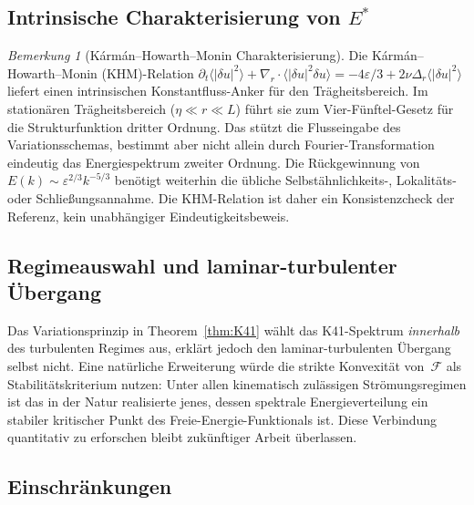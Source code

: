 \documentclass[12pt,a4paper]{article}
\theoremstyle{definition}
\theoremstyle{plain}
\theoremstyle{remark}
\newtheorem{remark}[definition]{Bemerkung}
\begin{document}
\subsection{Intrinsische Charakterisierung von \texorpdfstring{$E^*$}{E*}}

\begin{remark}[Kármán--Howarth--Monin Charakterisierung]
\label{rem:khm-intrinsic}
Die Kármán--Howarth--Monin (KHM)-Relation
$\partial_t \langle |\delta u|^2 \rangle + \nabla_r \cdot
\langle |\delta u|^2 \delta u \rangle = -4\varepsilon/3
+ 2\nu \Delta_r \langle |\delta u|^2 \rangle$ liefert einen intrinsischen
Konstantfluss-Anker für den Trägheitsbereich. Im stationären
Trägheitsbereich ($\eta \ll r \ll L$) führt sie zum Vier-Fünftel-Gesetz für
die Strukturfunktion dritter Ordnung. Das stützt die Flusseingabe des
Variationsschemas, bestimmt aber nicht allein durch Fourier-Transformation
eindeutig das Energiespektrum zweiter Ordnung. Die Rückgewinnung von
$E(k)\sim \varepsilon^{2/3}k^{-5/3}$ benötigt weiterhin die übliche
Selbstähnlichkeits-, Lokalitäts- oder Schließungsannahme. Die KHM-Relation
ist daher ein Konsistenzcheck der Referenz, kein unabhängiger
Eindeutigkeitsbeweis.
\end{remark}

\subsection{Regimeauswahl und laminar-turbulenter Übergang}

Das Variationsprinzip in Theorem~\ref{thm:K41} wählt das K41-Spektrum \emph{innerhalb} des turbulenten Regimes aus, erklärt jedoch den laminar-turbulenten Übergang selbst nicht. Eine natürliche Erweiterung würde die strikte Konvexität von~$\mathcal{F}$ als Stabilitätskriterium nutzen: Unter allen kinematisch zulässigen Strömungsregimen ist das in der Natur realisierte jenes, dessen spektrale Energieverteilung ein stabiler kritischer Punkt des Freie-Energie-Funktionals ist. Diese Verbindung quantitativ zu erforschen bleibt zukünftiger Arbeit überlassen.

\subsection{Einschränkungen}
\end{document}
